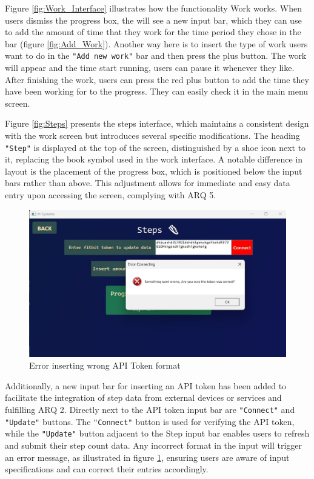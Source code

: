 \documentclass[11pt]{article}
\begin{document}
\newpage

Figure \ref{fig:Work_Interface} illustrates how the functionality Work works. When users dismiss
the progress box, the will see a new input bar, which they can use to add the amount of time that
they work for the time period they chose in the bar (figure \ref{fig:Add_Work}). Another way here
is to insert the type of work users want to do in the \texttt{"Add new work"} bar and then press 
the plus button. The work will appear and the time start running, users can pause it whenever they
like. After finishing the work, users can press the red plus button to add the time they have been
working for to the progress. They can easily check it in the main menu screen.\par

Figure \ref{fig:Steps} presents the steps interface, which maintains a consistent design
with the work screen but introduces several specific modifications. The heading \texttt{"Step"} is
displayed at the top of the screen, distinguished by a shoe icon next to it, replacing the
book symbol used in the work interface. A notable difference in layout is the placement of
the progress box, which is positioned below the input bars rather than above. This adjustment
allows for immediate and easy data entry upon accessing the screen, complying with ARQ 5.\par

\vspace{-7pt}
\begin{figure}[!ht]
  \centering
  \includegraphics[width = 0.5\linewidth]{Error}
  \caption{Error inserting wrong API Token format}
  \label{fig:Error}
\end{figure}
\vspace{-7pt}

Additionally, a new input bar for inserting an API token has been added to facilitate the integration of step data from
external devices or services and fulfilling ARQ 2. Directly next to the API token input bar are \texttt{"Connect"} and 
\texttt{"Update"} buttons. The \texttt{"Connect"} button is used for verifying the API token, while the \texttt{"Update"}
button adjacent to the Step input bar enables users to refresh and submit their step count 
data. Any incorrect format in the input will trigger an error message, as illustrated in 
figure \ref{fig:Error}, ensuring users are aware of input specifications and can correct their entries accordingly.\par
\end{document}
